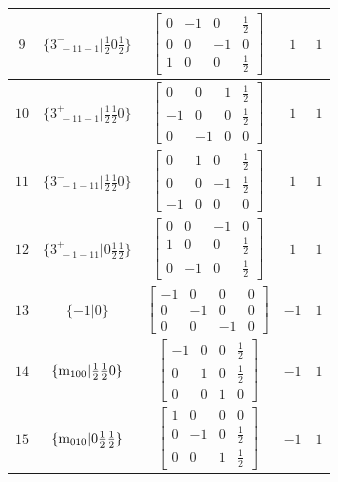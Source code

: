 \documentclass[fleqn,8pt]{jsarticle}
\begin{document}
\begin{longtable}{ccccc}
$ 9 $ & $ \{3^{-}_{\,\,-11-1}|\frac{1}{2} 0 \frac{1}{2}\} $ & $ \begin{bmatrix} 0 & -1 & 0 & \frac{1}{2} \\ 0 & 0 & -1 & 0 \\ 1 & 0 & 0 & \frac{1}{2} \end{bmatrix} $ & $ 1 $ & $ 1 $ \\ \hline
$ 10 $ & $ \{3^{+}_{\,\,-11-1}|\frac{1}{2} \frac{1}{2} 0\} $ & $ \begin{bmatrix} 0 & 0 & 1 & \frac{1}{2} \\ -1 & 0 & 0 & \frac{1}{2} \\ 0 & -1 & 0 & 0 \end{bmatrix} $ & $ 1 $ & $ 1 $ \\ \hline
$ 11 $ & $ \{3^{-}_{\,\,-1-11}|\frac{1}{2} \frac{1}{2} 0\} $ & $ \begin{bmatrix} 0 & 1 & 0 & \frac{1}{2} \\ 0 & 0 & -1 & \frac{1}{2} \\ -1 & 0 & 0 & 0 \end{bmatrix} $ & $ 1 $ & $ 1 $ \\ \hline
$ 12 $ & $ \{3^{+}_{\,\,-1-11}|0 \frac{1}{2} \frac{1}{2}\} $ & $ \begin{bmatrix} 0 & 0 & -1 & 0 \\ 1 & 0 & 0 & \frac{1}{2} \\ 0 & -1 & 0 & \frac{1}{2} \end{bmatrix} $ & $ 1 $ & $ 1 $ \\ \hline
$ 13 $ & $ \{-1|0\} $ & $ \begin{bmatrix} -1 & 0 & 0 & 0 \\ 0 & -1 & 0 & 0 \\ 0 & 0 & -1 & 0 \end{bmatrix} $ & $ -1 $ & $ 1 $ \\ \hline
$ 14 $ & $ \{{\rm m}_{100}|\frac{1}{2} \frac{1}{2} 0\} $ & $ \begin{bmatrix} -1 & 0 & 0 & \frac{1}{2} \\ 0 & 1 & 0 & \frac{1}{2} \\ 0 & 0 & 1 & 0 \end{bmatrix} $ & $ -1 $ & $ 1 $ \\ \hline
$ 15 $ & $ \{{\rm m}_{010}|0 \frac{1}{2} \frac{1}{2}\} $ & $ \begin{bmatrix} 1 & 0 & 0 & 0 \\ 0 & -1 & 0 & \frac{1}{2} \\ 0 & 0 & 1 & \frac{1}{2} \end{bmatrix} $ & $ -1 $ & $ 1 $ \\ \hline

\end{longtable}
\end{document}
